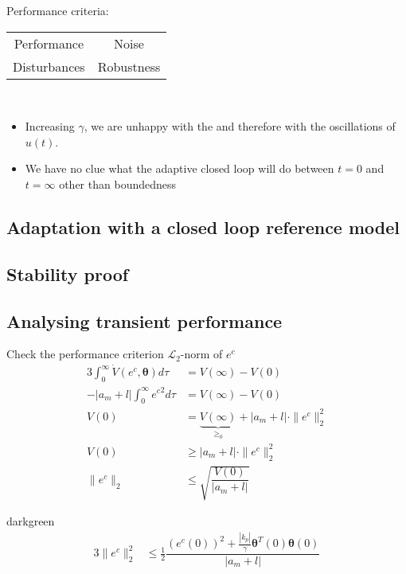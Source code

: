 Performance criteria:
\begin{center}
\begin{tabu} to \columnwidth {cc}
Performance & Noise\\
Disturbances    & Robustness
\end{tabu}
\end{center}~

\begin{itemize}
\item Increasing $\gamma$, we are unhappy with the
    and therefore with the oscillations of $u(t)$.
\item We have no clue what the adaptive closed loop
    will do between $t=0$ and $t=\infty$ other than boundedness
\end{itemize}

\subsection{Adaptation with a closed loop reference model}


\subsection{Stability proof}


\subsection{Analysing transient performance}
Check the performance criterion $ \mathcal{L}_2$-norm of $e^c$
\begin{alignat*}{3}
\int_0^\infty \dot{V}(e^c, \bm{\theta}) d\tau &= V(\infty) - V(0)\\
-| a_m + l |\int_0^\infty {e^c}^2 d\tau &= V(\infty) - V(0)\\
V(0) &= \underbrace{V(\infty)}_{\geq_0} + |a_m + l| \cdot \| e^c \|_2^2\\%
V(0) &\geq |a_m + l| \cdot \| e^c \|_2^2 \\
\| e^c \|_2 &\leq \sqrt{\dfrac{V(0)}{|a_m + l|}}
\end{alignat*}

\begin{conclusion}{darkgreen}
\begin{alignat}{3}
\| e^c \|_2^2 &\leq \frac{1}{2} \dfrac{(e^c(0))^2 + \frac{|k_p|}{\gamma} \bm{\theta}^T(0) \bm{\theta}(0)}{|a_m + l|} 
    \label{eq:ec-2norm}
\end{alignat}
\end{conclusion}

